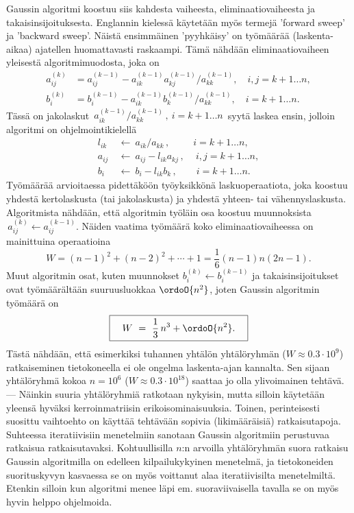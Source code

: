 Gaussin algoritmi koostuu siis kahdesta vaiheesta, eliminaatiovaiheesta ja 
takaisinsijoituksesta. Englannin kielessä käytetään myös termejä 'forward sweep' ja
'backward sweep'. Näistä ensimmäinen 'pyyhkäisy' on työmäärää (laskenta-aikaa) ajatellen 
huomattavasti raskaampi. Tämä nähdään eliminaatiovaiheen yleisestä algoritmimuodosta, joka on
\begin{align*}
a_{ij}^{(k)} &= a_{ij}^{(k-1)} - a_{ik}^{(k-1)}a_{kj}^{(k-1)}/a_{kk}^{(k-1)}, \quad 
                                                                         i,j = k+1 \ldots n, \\
b_i^{(k)} &= b_i^{(k-1)} - a_{ik}^{(k-1)}b_k^{(k-1)}/a_{kk}^{(k-1)}, \quad i = k+1 \ldots n.
\end{align*}
Tässä on jakolaskut $\,a_{ik}^{(k-1)}/a_{kk}^{(k-1)}\,,\ i=k+1 \ldots n\,$ syytä laskea ensin,
jolloin algoritmi on ohjelmointikielellä
\begin{align*}
l_{ik}\ &\leftarrow\ a_{ik}/a_{kk}\,, \qquad\ \ i=k+1 \ldots n, \\
a_{ij}\ &\leftarrow\ a_{ij} - l_{ik}a_{kj}\,, \quad\, i,j=k+1 \ldots n, \\
b_i\    &\leftarrow\ b_i - l_{ik}b_k\,, \qquad i=k+1 \ldots n.
\end{align*}
Työmäärää arvioitaessa pidettäköön työyksikkönä laskuoperaatiota, joka koostuu yhdestä 
kertolaskusta (tai jakolaskusta) ja yhdestä yhteen- tai vähennyslaskusta. Algoritmista nähdään,
että algoritmin työläin osa koostuu muunnoksista $\,a_{ij}^{(k)} \leftarrow a_{ij}^{(k-1)}$.
Näiden vaatima työmäärä koko eliminaatiovaiheessa on mainittuina operaatioina
\[
W = (n-1)^2+(n-2)^2 + \cdots + 1 = \frac{1}{6}(n-1)n(2n-1).
\]
Muut algoritmin osat, kuten muunnokset $b_i^{(k)} \leftarrow b_i^{(k-1)}$ ja takaisinsijoitukset
ovat työmäärältään suuruusluokkaa $\ordoO{n^2}$, joten Gaussin algoritmin työmäärä on
\[
\boxed{\quad W\ =\ \frac{1}{3}\,n^3 + \ordoO{n^2}. \quad}
\]
Tästä nähdään, että esimerkiksi tuhannen yhtälön yhtälöryhmän ($W \approx 0.3 \cdot 10^9$) 
ratkaiseminen tietokoneella ei ole ongelma laskenta-ajan kannalta. Sen sijaan yhtälöryhmä
kokoa $n=10^6$ ($W \approx 0.3 \cdot 10^{18}$) saattaa jo olla ylivoimainen tehtävä. ---
Näinkin suuria yhtälöryhmiä ratkotaan nykyisin, mutta silloin käytetään yleensä hyväksi
kerroinmatriisin erikoisominaisuuksia. Toinen, perinteisesti suosittu vaihtoehto on käyttää
tehtävään sopivia
 (likimääräisiä) ratkaisutapoja. Suhteessa iteratiivisiin menetelmiin
sanotaan Gaussin algoritmiin perustuvaa ratkaisua  ratkaisutavaksi.
Kohtuullisilla $n$:n arvoilla yhtälöryhmän suora ratkaisu Gaussin algoritmilla on edelleen
kilpailukykyinen menetelmä, ja tietokoneiden suorituskyvyn kasvaessa se on myös voittanut alaa
iteratiivisilta menetelmiltä. Etenkin silloin kun algoritmi menee läpi em. suoraviivaisella
tavalla se on myös hyvin helppo ohjelmoida.

